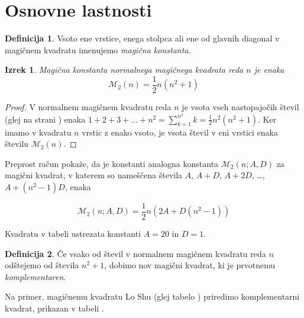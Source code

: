 \documentclass[a4paper,12pt]{article}
\newcommand{\pojem}[1]{\emph{\color{purple}#1}}
\theoremstyle{plain}
\newtheorem{izrek}{Izrek}
\theoremstyle{definition}
\newtheorem{definicija}{Definicija}
\theoremstyle{proof}
\begin{document}

\section{Osnovne lastnosti}

\begin{definicija}
      Vsoto ene vrstice, enega stolpca ali ene od glavnih diagonal
      v magičnem kvadratu imenujemo \pojem{magična konstanta}.
\end{definicija}

\begin{izrek}
   Magična konstanta normalnega magičnega kvadrata reda \(n\)
   je enaka
   \begin{equation}
      \mathcal{M}_2(n) = \frac{1}{2} n(n^2+1)
      \label{eq:mc}
   \end{equation}
\end{izrek}

 \begin{proof}
   V normalnem magičnem kvadratu reda $n$ je vsota vseh nastopajočih
   števil (glej \cite{eq:numbers} na strani \cite{eq:numbers}) enaka
   $1+2+3+\dots+n^2=\sum_{k=1}^{n^2}k=\frac{1}{2}n^2(n^2+1)$. Ker imamo
   v kvadratu $n$ vrstic z enako vsoto, je vsota števil v eni vrstici
   enaka številu $\mathcal{M}_2(n)$. %
\end{proof}

Preprost račun pokaže, da je konstanti \cite{eq:mc} analogna konstanta
$\mathcal{M}_2(n;A,D)$ za magični kvadrat, v katerem so nameščena števila
$A$, $A+D$, $A+2D$, \dots, $A+(n^2-1)D$, enaka %

\begin{equation}
   \label{eq:mc}
   \mathcal{M}_2(n;A,D) = \frac{1}{2} n(2A+D(n^2-1))
\end{equation}

Kvadratu v tabeli \cite {eqref} ustrezata konstanti $A=20$ in $D=1$.

\begin{definicija}
      Če vsako od števil v normalnem magičnem kvadratu reda $n$ odštejemo
      od števila $n^2+1$, dobimo nov magični kvadrat, ki je prvotnemu
      \pojem{komplementaren}.
\end{definicija}

Na primer, magičnemu kvadratu Lo Shu (glej tabelo \cite {ref}) priredimo
komplementarni kvadrat, prikazan v tabeli \cite{ref}.
%
\end{document}
